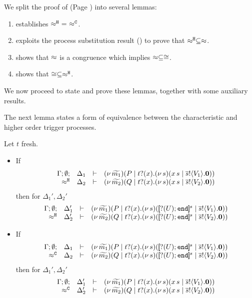 \noi We split the proof of  (Page \pageref{the:coincidence}) into 
several lemmas:
\begin{enumerate}[$-$]
\item	{} establishes $\hwb\ =\ \fwb$.
\item	{} exploits the process substitution result
		() to prove that $\approx^\mathtt{H} \subseteq \approx$.
\item	{} shows that $\approx$ is a congruence
		which implies $\approx \subseteq \cong$.
\item	{} shows  that $\cong \subseteq \approx^\mathtt{H}$.
\end{enumerate}


\noi
We now proceed to state and prove these lemmas, together with some auxiliary results.

The next lemma states a form of equivalence between the characteristic
and higher order trigger processes.

\begin{lemma}
	\label{lem:trigger_equiv}
	Let $t$ fresh.
	\begin{itemize}
		\item	If
				\[
					\begin{array}{rcll} \Gamma; \emptyset; &\Delta_1& \vdash& (\nu\, \widetilde{m_1})(P \;|\; t ? (x) . (\nu\, s)(x\, {s} \;|\; \overline{s} ! \langle V_1 \rangle . \mathbf{0}))\\ \approx^\mathtt{H} &\Delta_2& \vdash &  (\nu\, \widetilde{m_2})(Q \;|\; t ? (x) . (\nu\, s)(x\, {s} \;|\; \overline{s} ! \langle V_2 \rangle . \mathbf{0}) ) \end{array}
				\]
				then for $\Delta_1', \Delta_2'$
				\[
					\mhorel{\Gamma}{\Delta_1'}{\newsp{\widetilde{m_1}}{P \Par \fotrigger{t}{x}{s}{\btinp{U} \tinact}{V_1}}}
					{\hwb}
					{\Delta_2'}{}{\newsp{\widetilde{m_2}}{Q \Par \fotrigger{t}{x}{s}{\btinp{U} \tinact}{V_2}}}
				\]

		\item	If
				\[
					\mhorel{\Gamma}{\Delta_1}{\newsp{\widetilde{m_1}}{P \Par \fotrigger{t}{x}{s}{\btinp{U} \tinact}{V_1}}}
					{\fwb}
					{\Delta_2}{}{\newsp{\widetilde{m_2}}{Q \Par \fotrigger{t}{x}{s}{\btinp{U} \tinact}{V_2}}}
				\]
				then for $\Delta_1', \Delta_2'$
				\[
					\begin{array}{rcll} \Gamma; \emptyset; &\Delta_1'& \vdash& (\nu\, \widetilde{m_1})(P \;|\; t ? (x) . (\nu\, s)(x\, {s} \;|\; \overline{s} ! \langle V_1 \rangle . \mathbf{0}))\\ \approx^\mathtt{C} &\Delta_2'& \vdash &  (\nu\, \widetilde{m_2})(Q \;|\; t ? (x) . (\nu\, s)(x\, {s} \;|\; \overline{s} ! \langle V_2 \rangle . \mathbf{0}) ) \end{array}
				\]
	\end{itemize}
\end{lemma}

